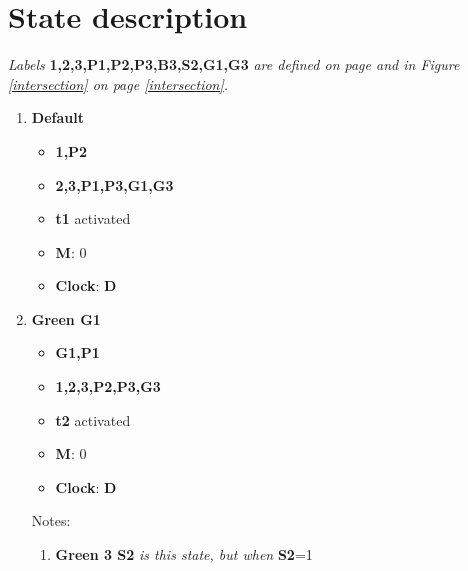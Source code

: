 \documentclass[letterpaper]{article}
\begin{document}
\section{State description}
\textit{Labels}
\textbf{1,2,3,P1,P2,P3,B3,S2,G1,G3}
\textit{are defined on page \pageref{Definitions} and in Figure \ref{intersection} on page \ref{intersection}.}
\begin{enumerate}
 \item \textbf{Default}
       \begin{itemize}
        \item {\color{green}\textbf{1,P2}}
        \item {\color{red}\textbf{2,3,P1,P3,G1,G3}}
        \item \textbf{t1} activated
        \item \textbf{M}: 0
        \item \textbf{Clock}: \textbf{D}
       \end{itemize}
 \item \textbf{Green G1}
       \begin{itemize}
        \item {\color{green}\textbf{G1,P1}}
        \item {\color{red}\textbf{1,2,3,P2,P3,G3}}
        \item \textbf{t2} activated
        \item \textbf{M}: 0
        \item \textbf{Clock}: \textbf{D}
       \end{itemize}
       Notes:
       \begin{enumerate}
        \item \textbf{Green 3 S2} \textit{is this state, but when} \textbf{S2}=1
       \end{enumerate}



\end{enumerate}
\end{document}
